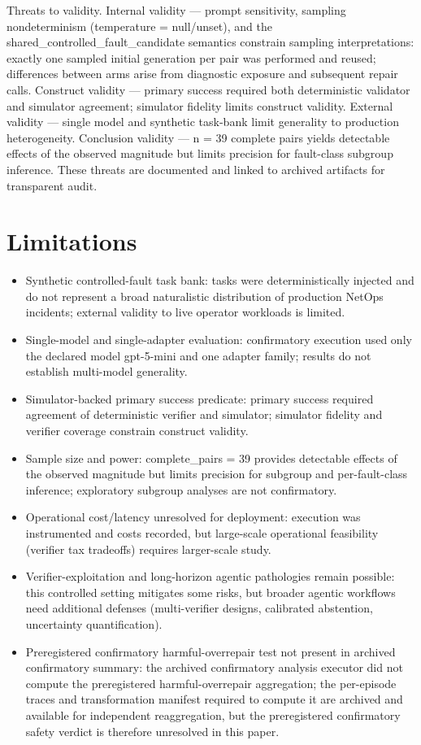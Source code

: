 \documentclass[conference]{IEEEtran}
\begin{document}
Threats to validity. Internal validity --- prompt sensitivity, sampling nondeterminism (temperature = null/unset), and the shared\_controlled\_fault\_candidate semantics constrain sampling interpretations: exactly one sampled initial generation per pair was performed and reused; differences between arms arise from diagnostic exposure and subsequent repair calls. Construct validity --- primary success required both deterministic validator and simulator agreement; simulator fidelity limits construct validity. External validity --- single model and synthetic task-bank limit generality to production heterogeneity. Conclusion validity --- n = 39 complete pairs yields detectable effects of the observed magnitude but limits precision for fault-class subgroup inference. These threats are documented and linked to archived artifacts for transparent audit.

\section{Limitations}
\begin{itemize}
\item Synthetic controlled-fault task bank: tasks were deterministically injected and do not represent a broad naturalistic distribution of production NetOps incidents; external validity to live operator workloads is limited.
\item Single-model and single-adapter evaluation: confirmatory execution used only the declared model gpt-5-mini and one adapter family; results do not establish multi-model generality.
\item Simulator-backed primary success predicate: primary success required agreement of deterministic verifier and simulator; simulator fidelity and verifier coverage constrain construct validity.
\item Sample size and power: complete\_pairs = 39 provides detectable effects of the observed magnitude but limits precision for subgroup and per-fault-class inference; exploratory subgroup analyses are not confirmatory.
\item Operational cost/latency unresolved for deployment: execution was instrumented and costs recorded, but large-scale operational feasibility (verifier tax tradeoffs) requires larger-scale study.
\item Verifier-exploitation and long-horizon agentic pathologies remain possible: this controlled setting mitigates some risks, but broader agentic workflows need additional defenses (multi-verifier designs, calibrated abstention, uncertainty quantification).
\item Preregistered confirmatory harmful-overrepair test not present in archived confirmatory summary: the archived confirmatory analysis executor did not compute the preregistered harmful-overrepair aggregation; the per-episode traces and transformation manifest required to compute it are archived and available for independent reaggregation, but the preregistered confirmatory safety verdict is therefore unresolved in this paper.
\end{itemize}
\end{document}
